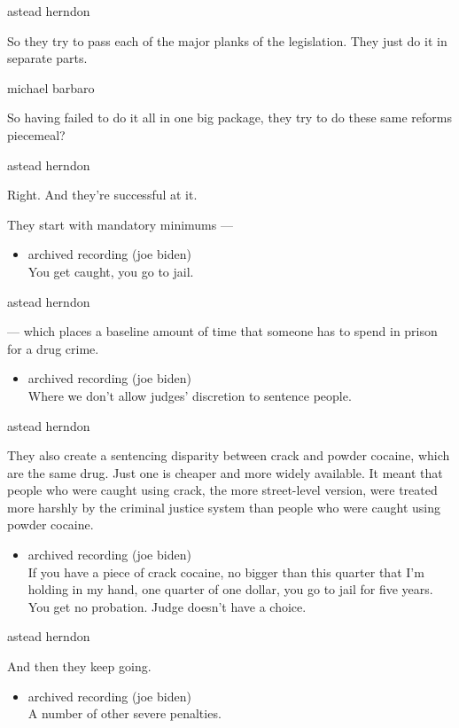 astead herndon

So they try to pass each of the major planks of the legislation. They
just do it in separate parts.

michael barbaro

So having failed to do it all in one big package, they try to do these
same reforms piecemeal?

astead herndon

Right. And they're successful at it.

They start with mandatory minimums ---

\begin{itemize}
\tightlist
\item
  archived recording (joe biden)\\
  You get caught, you go to jail.
\end{itemize}

astead herndon

--- which places a baseline amount of time that someone has to spend in
prison for a drug crime.

\begin{itemize}
\tightlist
\item
  archived recording (joe biden)\\
  Where we don't allow judges' discretion to sentence people.
\end{itemize}

astead herndon

They also create a sentencing disparity between crack and powder
cocaine, which are the same drug. Just one is cheaper and more widely
available. It meant that people who were caught using crack, the more
street-level version, were treated more harshly by the criminal justice
system than people who were caught using powder cocaine.

\begin{itemize}
\tightlist
\item
  archived recording (joe biden)\\
  If you have a piece of crack cocaine, no bigger than this quarter that
  I'm holding in my hand, one quarter of one dollar, you go to jail for
  five years. You get no probation. Judge doesn't have a choice.
\end{itemize}

astead herndon

And then they keep going.

\begin{itemize}
\tightlist
\item
  archived recording (joe biden)\\
  A number of other severe penalties.
\end{itemize}

